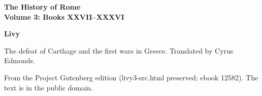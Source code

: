 \documentclass[11pt,letterpaper]{article}
\begin{document}
\color{ink}

\begin{titlepage}
\centering
\vspace*{4em}
{\LARGE\bfseries\color{heading} The History of Rome\\[0.3em]Volume 3: Books XXVII--XXXVI\par}
\vspace{2em}
{\Large\bfseries\color{heading} Livy\par}
\vspace{2.5em}
{\itshape\color{subhead}\parbox{0.8\linewidth}{\centering The defeat of Carthage and the first wars in Greece. Translated by Cyrus Edmonds.\par}}
\vfill
{\small From the Project Gutenberg edition (livy3-src.html preserved; ebook 12582). The text is in the public domain.\par}
\vspace{2em}
\end{titlepage}

\tableofcontents


\end{document}
